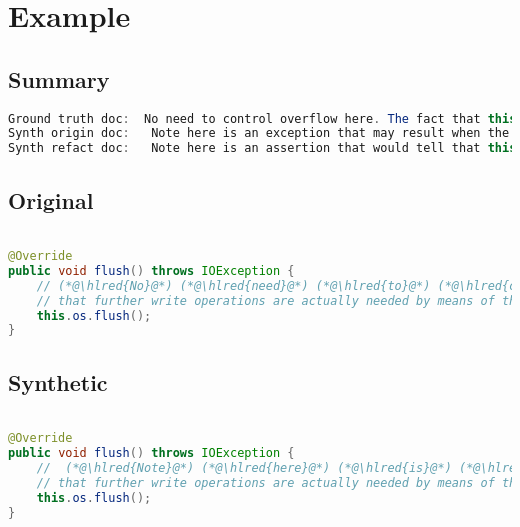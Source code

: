 \documentclass[11pt]{article}
\DeclareRobustCommand{\hlred}[1]{{\sethlcolor{YellowOrange}\hl{#1}}}
\begin{document}
\pagebreak
\section{Example}
\subsection{Summary}

\begin{lstlisting}[language=java]
Ground truth doc:  No need to control overflow here. The fact that this has overflow will be used as a flag to determine
Synth origin doc:   Note here is an exception that may result when the implementation checks whether and if the operation succeeds to
Synth refact doc:   Note here is an assertion that would tell that this writer knows now as is in case we detect
\end{lstlisting}

\subsection{Original}
\begin{lstlisting}[language=java]

@Override
public void flush() throws IOException {
    // (*@\hlred{No}@*) (*@\hlred{need}@*) (*@\hlred{to}@*) (*@\hlred{control}@*) (*@\hlred{overflow}@*) (*@\hlred{here.}@*) (*@\hlred{The}@*) (*@\hlred{fact}@*) (*@\hlred{that}@*) (*@\hlred{this}@*) (*@\hlred{has}@*) (*@\hlred{overflow}@*) (*@\hlred{will}@*) (*@\hlred{be}@*) (*@\hlred{used}@*) (*@\hlred{as}@*) (*@\hlred{a}@*) (*@\hlred{flag}@*) to(*@\hlred{ determine}@*)
    // that further write operations are actually needed by means of the isOverflown() method.
    this.os.flush();
}
\end{lstlisting}
\subsection{Synthetic}

\begin{lstlisting}[language=java]

@Override
public void flush() throws IOException {
    //  (*@\hlred{Note}@*) (*@\hlred{here}@*) (*@\hlred{is}@*) (*@\hlred{an}@*) (*@\hlred{exception}@*) (*@\hlred{that}@*) (*@\hlred{may}@*) (*@\hlred{result}@*) (*@\hlred{when}@*) (*@\hlred{the}@*) (*@\hlred{implementation}@*) (*@\hlred{checks}@*) (*@\hlred{whether}@*) (*@\hlred{and}@*) (*@\hlred{if}@*) (*@\hlred{the}@*) (*@\hlred{operation}@*) (*@\hlred{succeeds}@*) to
    // that further write operations are actually needed by means of the isOverflown() method.
    this.os.flush();
}
\end{lstlisting}
\end{document}

